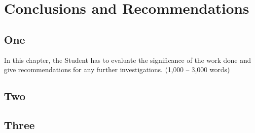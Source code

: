 
\chapter{Conclusions and Recommendations}
\begin{spacing}{1.5}
\setlength{\parskip}{0.3in}

\section{One}

In this chapter, the Student has to evaluate the significance of the work done and give recommendations for any further investigations. (1,000 – 3,000 words)

\section{Two}

\section{Three}


\end{spacing}
\newpage
